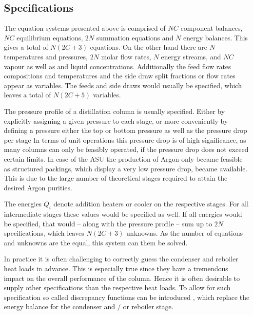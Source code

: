     \subsection{Specifications}
        The equation systems presented above is comprised of $NC$ component balances, $NC$ equilibrium
        equations, $2N$ summation equations and $N$ energy balances. This gives a total of $N (2C + 3)$
        equations. On the other hand there are $N$ temperatures and pressures, $2N$ molar flow rates,
        $N$ energy streams, and $NC$ vapour as well as and liquid concentrations. Additionally the feed flow rates
        compositions and temperatures and the side draw split fractions or flow rates appear as variables. The
        feeds and side draws would usually be specified, which leaves a total of $N (2C + 5)$ variables.

        The pressure profile of a distillation column is usually specified. Either by explicitly
        assigning a given pressure to each stage, or more conveniently by defining a pressure
        either the top or bottom pressure as well as the pressure drop per stage
        In terms of unit operations this pressure drop is of high significance,
        as many columns can only be feasibly operated, if the pressure drop does not exceed certain
        limits. In case of the ASU the production of Argon only became feasible as structured
        packings, which display a very low pressure drop, became available. This is due to the large
        number of theoretical stages required to attain the desired Argon purities.

        The energies $Q_i$ denote addition heaters or cooler on the respective stages. For all
        intermediate stages these values would be specified as well. If all energies would be
        specified, that would -- along with the pressure profile -- sum up to $2N$ specifications,
        which leaves $N (2C + 3)$ unknowns. As the number of equations and unknowns are the equal,
        this system can them be solved.

        In practice it is often challenging to correctly guess the condenser and reboiler heat loads in
        advance. This is especially true since they have a tremendous impact on the overall performance
        of the column. Hence it is often desirable to supply other specifications than the respective
        heat loads. To allow for such specification so called discrepancy functions can be introduced \cite{Henley.op.2011},
        which replace the energy balance for the condenser and / or reboiler stage.

